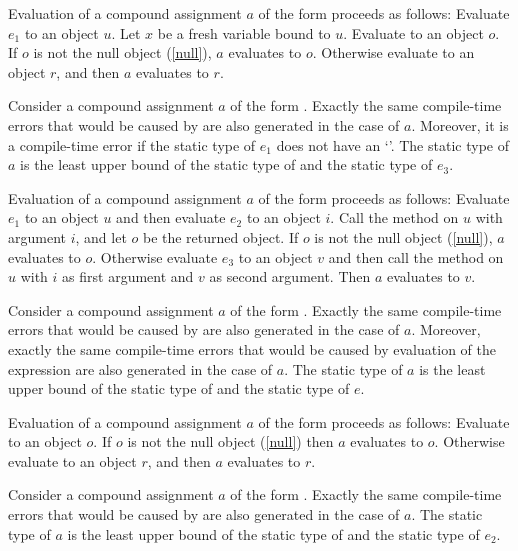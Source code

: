 \documentclass[makeidx]{article}
\begin{document}
{\LMHash{}%
Evaluation of a compound assignment $a$ of the form 
proceeds as follows:
Evaluate $e_1$ to an object $u$.
Let $x$ be a fresh variable bound to $u$.
Evaluate  to an object $o$.
If $o$ is not the null object (\ref{null}), $a$ evaluates to $o$.
Otherwise evaluate  to an object $r$,
and then $a$ evaluates to $r$.
\EndCase

\LMHash{}%
Consider a compound assignment $a$ of the form .
Exactly the same compile-time errors that would be caused by
are also generated in the case of $a$.
Moreover, it is a compile-time error
if the static type of $e_1$ does not have an `'.
The static type of $a$ is the least upper bound of
the static type of  and the static type of $e_3$.

\LMHash{}%
Evaluation of a compound assignment $a$ of the form
proceeds as follows:
Evaluate $e_1$ to an object $u$ and then evaluate $e_2$ to an object $i$.
Call the \code{[]} method on $u$ with argument $i$,
and let $o$ be the returned object.
If $o$ is not the null object (\ref{null}), $a$ evaluates to $o$.
Otherwise evaluate $e_3$ to an object $v$
and then call the \code{[]=} method on $u$
with $i$ as first argument and $v$ as second argument.
Then $a$ evaluates to $v$.
\EndCase

\LMHash{}%
Consider a compound assignment $a$ of the form .
Exactly the same compile-time errors that would be caused by
are also generated in the case of $a$.
Moreover, exactly the same compile-time errors that would be caused by
evaluation of the expression 
are also generated in the case of $a$.
The static type of $a$ is the least upper bound of
the static type of  and the static type of $e$.

\LMHash{}%
Evaluation of a compound assignment $a$ of the form 
proceeds as follows:
Evaluate  to an object $o$.
If $o$ is not the null object (\ref{null}) then $a$ evaluates to $o$.
Otherwise evaluate  to an object $r$,
and then $a$ evaluates to $r$.
\EndCase

\LMHash{}%
Consider a compound assignment $a$ of the form .
Exactly the same compile-time errors that would be caused by
are also generated in the case of $a$.
The static type of $a$ is the least upper bound of
the static type of  and the static type of $e_2$.

}
\end{document}
